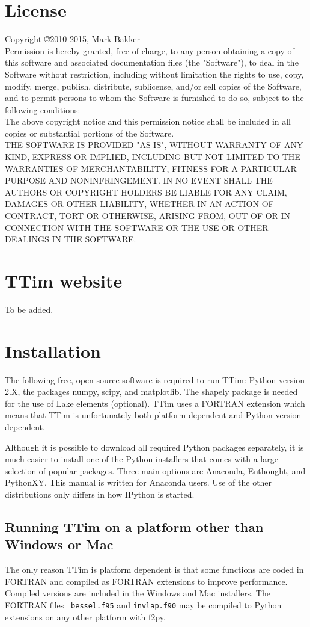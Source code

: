 \documentclass [10pt,letterpaper] {article}
\begin{document}
\section{License}
Copyright \copyright 2010-2015, Mark Bakker
\\Permission is hereby granted, free of charge, to any person obtaining a copy
of this software and associated documentation files (the "Software"), to deal
in the Software without restriction, including without limitation the rights
to use, copy, modify, merge, publish, distribute, sublicense, and/or sell
copies of the Software, and to permit persons to whom the Software is
furnished to do so, subject to the following conditions:
\\The above copyright notice and this permission notice shall be included in
all copies or substantial portions of the Software.
\\THE SOFTWARE IS PROVIDED "AS IS", WITHOUT WARRANTY OF ANY KIND, EXPRESS OR
IMPLIED, INCLUDING BUT NOT LIMITED TO THE WARRANTIES OF MERCHANTABILITY,
FITNESS FOR A PARTICULAR PURPOSE AND NONINFRINGEMENT. IN NO EVENT SHALL THE
AUTHORS OR COPYRIGHT HOLDERS BE LIABLE FOR ANY CLAIM, DAMAGES OR OTHER
LIABILITY, WHETHER IN AN ACTION OF CONTRACT, TORT OR OTHERWISE, ARISING FROM,
OUT OF OR IN CONNECTION WITH THE SOFTWARE OR THE USE OR OTHER DEALINGS IN
THE SOFTWARE.

\section{TTim website}
To be added.

\section{Installation}
The following free, open-source software is required to run TTim:
Python version 2.X, the packages numpy, scipy, and matplotlib. The shapely package is needed for the use of Lake elements (optional). TTim uses a FORTRAN extension which means that TTim is unfortunately both platform dependent
and Python version dependent. 

Although it is possible to download all required Python packages separately, it is much easier to install one of the Python installers that comes with a large selection of popular packages. Three main options are Anaconda, Enthought, and PythonXY. This manual is written for Anaconda users. Use of the other distributions only differs in how IPython is started.

\subsection{Running TTim on a platform other than Windows or Mac}
The only reason TTim is platform dependent is that some functions
are coded in FORTRAN and compiled as FORTRAN extensions to improve
performance. Compiled versions are included in the Windows and Mac installers. The FORTRAN files {\tt
bessel.f95} and {\tt invlap.f90} may be compiled to Python extensions on any other
platform with f2py.
\end{document}
